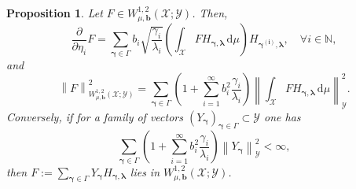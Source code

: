 \documentclass[namedate,webpdf]{ima-authoring-template-blank}
\def\D{\,\mathrm{d}}
\newcommand*{\nm}[1]{{\left\|#1\right \|}}
\newcounter{counter}
\numberwithin{counter}{section}
\numberwithin{equation}{section}
\theoremstyle{plain}
\newtheorem{proposition}[counter]{Proposition}
\theoremstyle{definition}
\newcommand*{\cX}{\mathcal{X}}
\newcommand*{\cY}{\mathcal{Y}}
\newcommand*{\bbN}{\mathbb{N}}
\theoremstyle{thmstyletwo}
\begin{document}
\begin{proposition}
\label{prop: l2-characterization of Gaussian Sobolev space}
    Let \(F \in W_{\mu, \bm{b}}^{1,2}(\cX; \cY)\). Then,
    \begin{equation}
    \label{eq: series expansion of partial derivative}
        \frac{\partial}{\partial \eta_i} F = \sum_{\bm{\gamma} \in \Gamma} b_i \sqrt{\frac{\gamma_i}{\lambda_i}} \left( \int_{\cX} F H_{\bm{\gamma}, \bm{\lambda}} \D \mu \right) H_{\bm{\gamma}^{\bm{(i)}}, \bm{\lambda}},
        \quad \forall i \in \bbN,
    \end{equation}
    and 
    \begin{equation}
    \label{eq: W^1,2 - l^2 isometry}
        \nm{F}_{W_{\mu, \bm{b}}^{1,2}(\cX; \cY)}^2
        = \sum_{\bm{\gamma} \in \Gamma} \left(1 + \sum_{i = 1}^{\infty} b_i^2 \frac{\gamma_i}{\lambda_i}\right) \nm{\int_{\cX} F H_{\bm{\gamma}, \bm{\lambda}} \D \mu}_{\cY}^2.
    \end{equation}
    Conversely, if for a family of vectors \((Y_{\bm{\gamma}})_{\bm{\gamma} \in \Gamma} \subset \cY\) one has
    \begin{equation}
    \label{eq: l2 summability of weighted coefficients}
        \sum_{\bm{\gamma} \in \Gamma} \left(1 + \sum_{i = 1}^{\infty} b_i^2 \frac{\gamma_i}{\lambda_i}\right) \nm{Y_{\bm{\gamma}}}_{\cY}^2 < \infty,
    \end{equation}
    then 
    \(
    F := \sum_{\bm{\gamma} \in \Gamma} Y_{\bm{\gamma}} H_{\bm{\gamma}, \bm{\lambda}}\) lies in \(W_{\mu, \bm{b}}^{1,2}(\cX; \cY)\).
\end{proposition}
\end{document}
